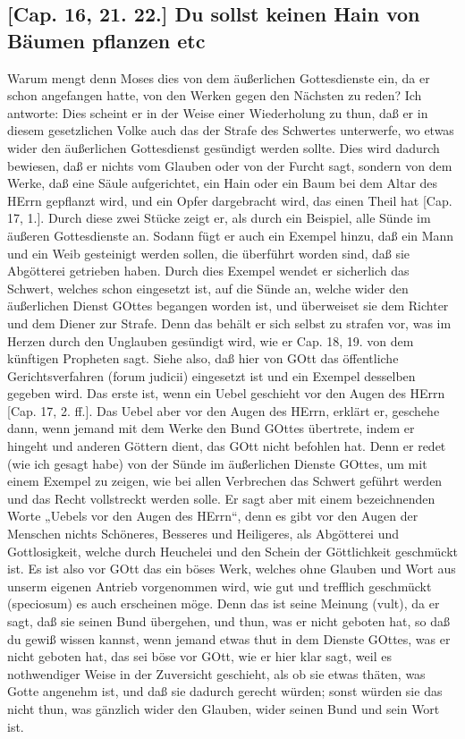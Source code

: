 \subsection{[Cap. 16, 21. 22.] Du sollst keinen Hain von Bäumen pflanzen etc}

Warum mengt denn Moses dies von dem äußerlichen Gottesdienste ein, da er schon angefangen hatte, von den Werken gegen den Nächsten zu reden? Ich antworte: Dies scheint er in der Weise einer Wiederholung zu thun, daß er in diesem gesetzlichen Volke auch das der Strafe des Schwertes unterwerfe, wo etwas wider den äußerlichen Gottesdienst gesündigt werden sollte. Dies wird dadurch bewiesen, daß er nichts vom Glauben oder von der Furcht
sagt, sondern von dem Werke, daß eine Säule aufgerichtet, ein Hain oder ein Baum bei dem Altar des HErrn gepflanzt wird, und ein Opfer dargebracht wird, das einen Theil hat [Cap. 17, 1.]. Durch diese zwei Stücke zeigt er, als durch ein Beispiel, alle Sünde im äußeren Gottesdienste an. Sodann fügt er auch ein Exempel hinzu, daß ein Mann und ein Weib gesteinigt werden sollen, die überführt worden sind, daß sie Abgötterei getrieben haben. Durch dies Exempel wendet er sicherlich das Schwert, welches schon eingesetzt ist, auf die Sünde an, welche wider den äußerlichen Dienst GOttes begangen worden ist, und überweiset sie dem Richter und dem Diener zur Strafe. Denn das behält er sich selbst zu strafen vor, was im Herzen durch den Unglauben gesündigt wird, wie er Cap. 18, 19. von dem künftigen Propheten sagt. Siehe also, daß hier von GOtt das öffentliche Gerichtsverfahren (forum judicii) eingesetzt ist und ein Exempel desselben gegeben wird. Das erste ist, wenn ein Uebel geschieht vor den Augen des HErrn [Cap. 17, 2. ff.]. Das Uebel aber vor den Augen des HErrn, erklärt er, geschehe dann, wenn jemand mit dem Werke den Bund GOttes übertrete, indem er hingeht und anderen Göttern dient, das GOtt nicht befohlen hat. Denn er redet (wie ich gesagt habe) von der Sünde im äußerlichen Dienste GOttes, um mit einem Exempel zu zeigen, wie bei allen Verbrechen das Schwert geführt werden und das Recht vollstreckt werden solle. Er sagt aber mit einem bezeichnenden Worte „Uebels vor den Augen des HErrn“, denn es gibt vor den Augen der Menschen nichts Schöneres, Besseres und Heiligeres, als Abgötterei und Gottlosigkeit, welche durch Heuchelei und den Schein der Göttlichkeit geschmückt ist. Es ist also vor GOtt das ein böses Werk, welches ohne Glauben und Wort aus unserm eigenen Antrieb vorgenommen wird, wie gut und trefflich geschmückt (speciosum) es auch erscheinen möge. Denn das ist seine Meinung (vult), da er sagt, daß sie seinen Bund übergehen, und thun, was er nicht geboten hat, so daß du gewiß wissen kannst, wenn jemand etwas thut in dem Dienste GOttes, was er nicht geboten hat, das sei böse vor GOtt, wie er hier klar sagt, weil es nothwendiger Weise in der Zuversicht geschieht, als ob sie etwas thäten, was Gotte angenehm ist, und daß sie dadurch gerecht würden; sonst würden sie das nicht thun, was gänzlich wider den Glauben, wider seinen Bund und sein Wort ist.

